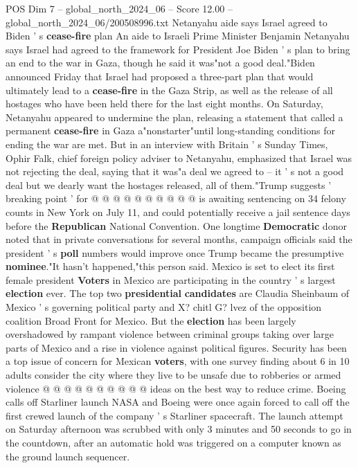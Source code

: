 \begin{textsample}{POS Dim 7 – global\_north\_2024\_06 – Score 12.00 – global\_north\_2024\_06/200508996.txt}  \label{ex:f7_pos_084}
Netanyahu aide says Israel agreed to Biden ' s \textbf{cease-fire} plan An aide to Israeli Prime Minister Benjamin Netanyahu says Israel had agreed to the framework for President Joe Biden ' s plan to bring an end to the war in Gaza, though he said it was"not a good deal."Biden announced Friday that Israel had proposed a three-part plan that would ultimately lead to a \textbf{cease-fire} in the Gaza Strip, as well as the release of all hostages who have been held there for the last eight months.
On Saturday, Netanyahu appeared to undermine the plan, releasing a statement that called a permanent \textbf{cease-fire} in Gaza a"nonstarter"until long-standing conditions for ending the war are met.
But in an interview with Britain ' s Sunday Times, Ophir Falk, chief foreign policy adviser to Netanyahu, emphasized that Israel was not rejecting the deal, saying that it was"a deal we agreed to -- it ' s not a good deal but we dearly want the hostages released, all of them."Trump suggests ' breaking point ' for @ @ @ @ @ @ @ @ @ @ is awaiting sentencing on 34 felony counts in New York on July 11, and could potentially receive a jail sentence days before the \textbf{Republican} National Convention.
One longtime \textbf{Democratic} donor noted that in private conversations for several months, campaign officials said the president ' s \textbf{poll} numbers would improve once Trump became the presumptive \textbf{nominee}."It hasn't happened,"this person said.
Mexico is set to elect its first female president \textbf{Voters} in Mexico are participating in the country ' s largest \textbf{election} ever.
The top two \textbf{presidential} \textbf{candidates} are Claudia Sheinbaum of Mexico ' s governing political party and X? chitl G? lvez of the opposition coalition Broad Front for Mexico.
But the \textbf{election} has been largely overshadowed by rampant violence between criminal groups taking over large parts of Mexico and a rise in violence against political figures.
Security has been a top issue of concern for Mexican \textbf{voters}, with one survey finding about 6 in 10 adults consider the city where they live to be unsafe due to robberies or armed violence @ @ @ @ @ @ @ @ @ @ ideas on the best way to reduce crime.
Boeing calls off Starliner launch NASA and Boeing were once again forced to call off the first crewed launch of the company ' s Starliner spacecraft.
The launch attempt on Saturday afternoon was scrubbed with only 3 minutes and 50 seconds to go in the countdown, after an automatic hold was triggered on a computer known as the ground launch sequencer.

\end{textsample}
